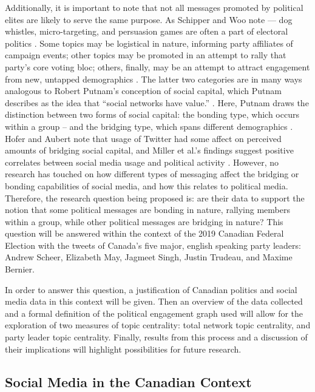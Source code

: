 Additionally, it is important to note that not all messages promoted by
political elites are likely to serve the same purpose. As Schipper and Woo note
— dog whistles, micro-targeting, and persuasion games are often a part of
electoral politics \cite{schipper2018political}. Some topics may be logistical
in nature, informing party affiliates of campaign events; other topics may be
promoted in an attempt to rally that party's core voting bloc; others, finally,
may be an attempt to attract engagement from new, untapped demographics
\cite{shah2007campaign}. The latter two categories are in many ways analogous to
Robert Putnam's conception of social capital, which Putnam describes as the idea
that ``social networks have value.'' \cite{putnam2000bowling}. Here, Putnam
draws the distinction between two forms of social capital: the bonding type,
which occurs within a group -- and the bridging type, which spans different
demographics \cite{putnam2000bowling}. Hofer and Aubert note that usage of
Twitter had some affect on perceived amounts of bridging social capital, and
Miller et al.'s findings suggest positive correlates between social media usage
and political activity \cite{hofer2013perceived,miller2015talking}. However, no
research has touched on how different types of messaging affect the bridging or
bonding capabilities of social media, and how this relates to political media.
Therefore, the research question being proposed is: are their data to support
the notion that some political messages are bonding in nature, rallying members
within a group, while other political messages are bridging in nature? This
question will be answered within the context of the 2019 Canadian Federal
Election with the tweets of Canada’s five major, english speaking party leaders:
Andrew Scheer, Elizabeth May, Jagmeet Singh, Justin Trudeau, and Maxime Bernier.


In order to answer this question, a justification of Canadian politics and
social media data in this context will be given. Then an overview of the data
collected and a formal definition of the political engagement graph used will
allow for the exploration of two measures of topic centrality: total network
topic centrality, and party leader topic centrality. Finally, results from this
process and a discussion of their implications will highlight possibilities for
future research.  

\subsection{Social Media in the Canadian Context}

